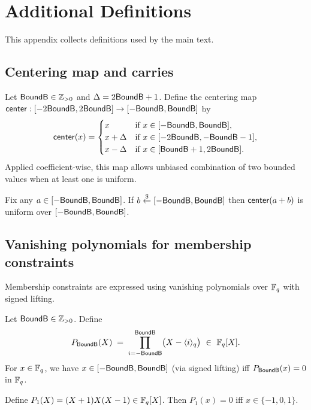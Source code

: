 \section{Additional Definitions}
\label{app:defs}

This appendix collects definitions used by the main text.

\subsection{Centering map and carries}
Let \(\mathsf{BoundB}\in\mathbb{Z}_{>0}\) and \(\Delta=2\mathsf{BoundB}+1\). Define the centering map
\(\mathsf{center}:[-2\mathsf{BoundB},2\mathsf{BoundB}]\to[-\mathsf{BoundB},\mathsf{BoundB}]\) by
\[
\mathsf{center}(x)=
\begin{cases}
x & \text{if } x\in[-\mathsf{BoundB},\mathsf{BoundB}],\\
x+\Delta & \text{if } x\in[-2\mathsf{BoundB},-\mathsf{BoundB}-1],\\
x-\Delta & \text{if } x\in[\mathsf{BoundB}+1,2\mathsf{BoundB}].
\end{cases}
\]
Applied coefficient-wise, this map allows unbiased combination of two bounded values when at least one is uniform.

\begin{lemma}\label{lem:center-uniform}
Fix any \(a\in[-\mathsf{BoundB},\mathsf{BoundB}]\). If \(b\overset{\$}{\leftarrow} [-\mathsf{BoundB},\mathsf{BoundB}]\) then \(\mathsf{center}(a+b)\) is uniform over
\([-\mathsf{BoundB},\mathsf{BoundB}]\).
\end{lemma}

\subsection{Vanishing polynomials for membership constraints}
Membership constraints are expressed using vanishing polynomials over \(\mathbb{F}_q\) with signed lifting.

\begin{definition}\label{def:vanish-bound}
Let \(\mathsf{BoundB}\in\mathbb{Z}_{>0}\). Define
\[
  P_{\BoundB}(X) \;=\; \prod_{i=-\BoundB}^{\BoundB}\bigl(X-\langle i\rangle_q\bigr)\ \in\ \Fq[X].
\]
For \(x\in\mathbb{F}_q\), we have \(x\in[-\mathsf{BoundB},\mathsf{BoundB}]\) (via signed lifting) iff \(P_{\mathsf{BoundB}}(x)=0\) in \(\mathbb{F}_q\).
\end{definition}

\begin{definition}\label{def:vanish-carry}
Define \(P_{1}(X)=(X+1)X(X-1)\in\mathbb{F}_q[X]\). Then \(P_1(x)=0\) iff \(x\in\{-1,0,1\}\).
\end{definition}
